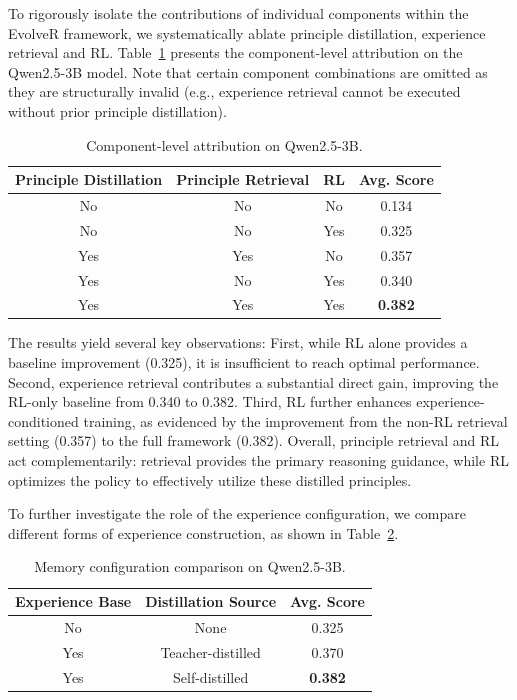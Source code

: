 To rigorously isolate the contributions of individual components within the EvolveR framework, we systematically ablate principle distillation, experience retrieval and RL. Table~\ref{tab:component_attribution} presents the component-level attribution on the Qwen2.5-3B model. Note that certain component combinations are omitted as they are structurally invalid (e.g., experience retrieval cannot be executed without prior principle distillation).

\begin{table}[ht]
\centering
\caption{Component-level attribution on Qwen2.5-3B.}
\label{tab:component_attribution}
\begin{tabular}{cccc}
\toprule
\textbf{Principle Distillation} & \textbf{Principle Retrieval} & \textbf{RL} & \textbf{Avg. Score} \\
\midrule
No & No & No & 0.134 \\
No & No & Yes & 0.325 \\
Yes & Yes & No & 0.357 \\
Yes & No & Yes & 0.340 \\
Yes & Yes & Yes & \textbf{0.382} \\
\bottomrule
\end{tabular}
\end{table}

The results yield several key observations: First, while RL alone provides a baseline improvement (0.325), it is insufficient to reach optimal performance. Second, experience retrieval contributes a substantial direct gain, improving the RL-only baseline from 0.340 to 0.382. Third, RL further enhances experience-conditioned training, as evidenced by the improvement from the non-RL retrieval setting (0.357) to the full framework (0.382). Overall, principle retrieval and RL act complementarily: retrieval provides the primary reasoning guidance, while RL optimizes the policy to effectively utilize these distilled principles.

To further investigate the role of the experience configuration, we compare different forms of experience construction, as shown in Table~\ref{tab:memory_config}.

\begin{table}[ht]
\centering
\caption{Memory configuration comparison on Qwen2.5-3B.}
\label{tab:memory_config}
\begin{tabular}{ccc}
\toprule
\textbf{Experience Base} & \textbf{Distillation Source} & \textbf{Avg. Score} \\
\midrule
No & None & 0.325 \\
Yes & Teacher-distilled & 0.370 \\
Yes & Self-distilled & \textbf{0.382} \\
\bottomrule
\end{tabular}
\end{table}


